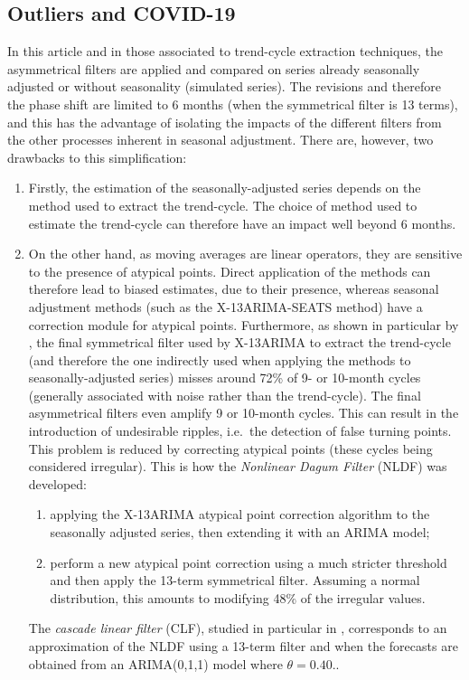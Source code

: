 \documentclass[
]{article}
\newcommand\1{\mathds{1}}
\begin{document}
\subsection{Outliers and COVID-19}\label{outliers-and-covid-19}

In this article and in those associated to trend-cycle extraction
techniques, the asymmetrical filters are applied and compared on series
already seasonally adjusted or without seasonality (simulated series).
The revisions and therefore the phase shift are limited to 6 months
(when the symmetrical filter is 13 terms), and this has the advantage of
isolating the impacts of the different filters from the other processes
inherent in seasonal adjustment. There are, however, two drawbacks to
this simplification:

\begin{enumerate}
\def\labelenumi{\arabic{enumi}.}
\item
  Firstly, the estimation of the seasonally-adjusted series depends on
  the method used to extract the trend-cycle. The choice of method used
  to estimate the trend-cycle can therefore have an impact well beyond 6
  months.
\item
  On the other hand, as moving averages are linear operators, they are
  sensitive to the presence of atypical points. Direct application of
  the methods can therefore lead to biased estimates, due to their
  presence, whereas seasonal adjustment methods (such as the
  X-13ARIMA-SEATS method) have a correction module for atypical points.
  Furthermore, as shown in particular by \textcite{dagum1996new}, the
  final symmetrical filter used by X-13ARIMA to extract the trend-cycle
  (and therefore the one indirectly used when applying the methods to
  seasonally-adjusted series) misses around 72\% of 9- or 10-month
  cycles (generally associated with noise rather than the trend-cycle).
  The final asymmetrical filters even amplify 9 or 10-month cycles. This
  can result in the introduction of undesirable ripples, i.e.~the
  detection of false turning points. This problem is reduced by
  correcting atypical points (these cycles being considered irregular).
  This is how the \emph{Nonlinear Dagum Filter} (NLDF) was developed:

  \begin{enumerate}
  \def\labelenumii{\alph{enumii}.}
  \item
    applying the X-13ARIMA atypical point correction algorithm to the
    seasonally adjusted series, then extending it with an ARIMA model;
  \item
    perform a new atypical point correction using a much stricter
    threshold and then apply the 13-term symmetrical filter. Assuming a
    normal distribution, this amounts to modifying 48\% of the irregular
    values.
  \end{enumerate}

  The \emph{cascade linear filter} (CLF), studied in particular in
  \textcite{dagumBianconcini2023}, corresponds to an approximation of
  the NLDF using a 13-term filter and when the forecasts are obtained
  from an ARIMA(0,1,1) model where \(\theta=0.40.\).
\end{enumerate}
\end{document}
